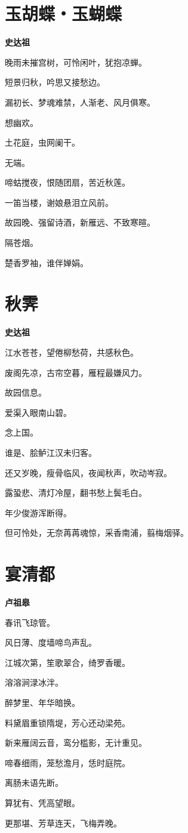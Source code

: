 \documentclass[12pt,a4paper]{ctexbook}
\begin{document}
\section{玉胡蝶・玉蝴蝶}
\textbf{史达祖}\par\vspace{0.5em}
晚雨未摧宫树，可怜闲叶，犹抱凉蝉。\par
短景归秋，吟思又接愁边。\par
漏初长、梦魂难禁，人渐老、风月俱寒。\par
想幽欢。\par
土花庭，虫网阑干。\par
无端。\par
啼蛄搅夜，恨随团扇，苦近秋莲。\par
一笛当楼，谢娘悬泪立风前。\par
故园晚、强留诗酒，新雁远、不致寒暄。\par
隔苍烟。\par
楚香罗袖，谁伴婵娟。\par

\section{秋霁}
\textbf{史达祖}\par\vspace{0.5em}
江水苍苍，望倦柳愁荷，共感秋色。\par
废阁先凉，古帘空暮，雁程最嫌风力。\par
故园信息。\par
爱渠入眼南山碧。\par
念上国。\par
谁是、脍鲈江汉未归客。\par
还又岁晚，瘦骨临风，夜闻秋声，吹动岑寂。\par
露蛩悲、清灯冷屋，翻书愁上鬓毛白。\par
年少俊游浑断得。\par
但可怜处，无奈苒苒魂惊，采香南浦，翦梅烟驿。\par

\section{宴清都}
\textbf{卢祖皋}\par\vspace{0.5em}
春讯飞琼管。\par
风日薄、度墙啼鸟声乱。\par
江城次第，笙歌翠合，绮罗香暖。\par
溶溶涧渌冰泮。\par
醉梦里、年华暗换。\par
料黛眉重锁隋堤，芳心还动梁苑。\par
新来雁阔云音，鸾分槛影，无计重见。\par
啼春细雨，笼愁澹月，恁时庭院。\par
离肠未语先断。\par
算犹有、凭高望眼。\par
更那堪、芳草连天，飞梅弄晚。\par
\end{document}
